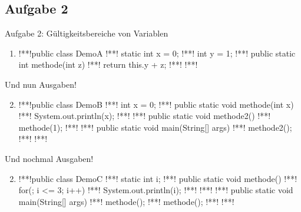 \subsection{Aufgabe 2}
{\taskenum
\begin{frame}[fragile]{Aufgabe 2: Gültigkeitsbereiche von Variablen}
\begin{enumerate}[<+(1)->]
    \item {}
\begin{plainjava}
!**!public class DemoA {
!**!    static int x = 0;
!**!    int y = 1;
!**!    public static int methode(int z){
!**!        return this.y + z;
!**!    }
!**!}
\end{plainjava}
\end{enumerate}
\end{frame}


\begin{frame}[fragile]{Und nun Ausgaben!}
\begin{enumerate}[<+(1)->]
    \setcounter{enumi}{1}
    \item {}
\begin{plainjava}
!**!public class DemoB {
!**!    int x = 0;
!**!    public static void methode(int x){
!**!        System.out.println(x);
!**!    }
!**!    public static void methode2(){
!**!        methode(1);
!**!    }
!**!    public static void main(String[] args){
!**!        methode2();
!**!    }
!**!}
\end{plainjava}
\end{enumerate}
\end{frame}

\begin{frame}[fragile]{Und nochmal Ausgaben!}
\begin{enumerate}[<+(1)->]
    \setcounter{enumi}{1}
    \item {}
\begin{plainjava}
!**!public class DemoC {
!**!    static int i;
!**!    public static void methode(){
!**!        for(; i <= 3; i++){
!**!            System.out.println(i);
!**!        }
!**!    }
!**!    public static void main(String[] args){
!**!        methode();
!**!        methode();
!**!    }
!**!}
\end{plainjava}
\end{enumerate}
\end{frame}
}

